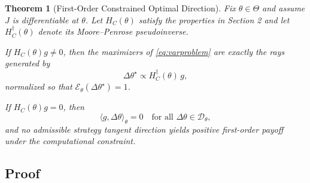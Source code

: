 \documentclass[11pt,a4paper,twocolumn]{article}
\newtheorem{theorem}{Theorem}
\begin{document}
 \begin{theorem}[First-Order Constrained Optimal Direction]
  \label{thm:firstorder}
  Fix $\theta\in\Theta$ and assume $J$ is differentiable at $\theta$.
  Let $H_C(\theta)$ satisfy the properties in Section 2 and let $H_C^\dagger(\theta)$ denote its Moore--Penrose pseudoinverse.
  
  If $H_C(\theta) g \neq 0$, then the maximizers of \eqref{eq:varproblem}
  are exactly the rays generated by
  \begin{equation}
   \label{eq:optimaldirection}
   \Delta\theta^\star
   \propto
   H_C^\dagger(\theta)\, g,
  \end{equation}
  normalized so that $\mathcal{E}_\theta(\Delta\theta^\star)=1$.
  
  If $H_C(\theta) g = 0$, then
  \[
  \langle g,\Delta\theta\rangle_\theta = 0
  \quad
  \text{for all } \Delta\theta\in\mathcal{D}_\theta,
  \]
  and no admissible strategy tangent direction yields positive first-order payoff under the computational constraint.
 \end{theorem}
 
 \subsection{Proof}
 
\end{document}
